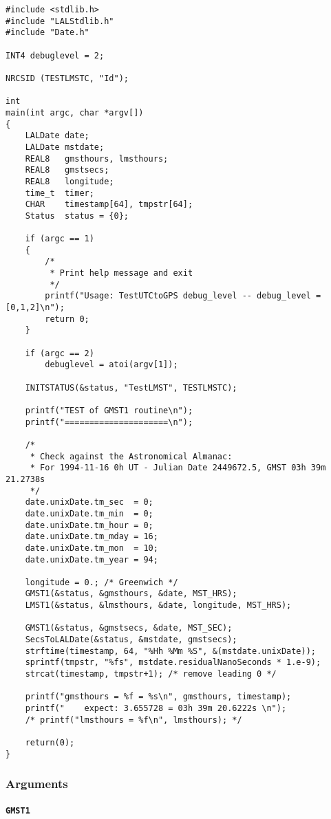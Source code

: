 \begin{verbatim}
#include <stdlib.h>
#include "LALStdlib.h"
#include "Date.h"

INT4 debuglevel = 2;

NRCSID (TESTLMSTC, "Id");

int
main(int argc, char *argv[])
{
    LALDate date;
    LALDate mstdate;
    REAL8   gmsthours, lmsthours;
    REAL8   gmstsecs;
    REAL8   longitude;
    time_t  timer;
    CHAR    timestamp[64], tmpstr[64];
    Status  status = {0};

    if (argc == 1)
    {
        /*
         * Print help message and exit
         */
        printf("Usage: TestUTCtoGPS debug_level -- debug_level = [0,1,2]\n");
        return 0;
    }

    if (argc == 2)
        debuglevel = atoi(argv[1]);

    INITSTATUS(&status, "TestLMST", TESTLMSTC);

    printf("TEST of GMST1 routine\n");
    printf("=====================\n");

    /*
     * Check against the Astronomical Almanac:
     * For 1994-11-16 0h UT - Julian Date 2449672.5, GMST 03h 39m 21.2738s
     */
    date.unixDate.tm_sec  = 0;
    date.unixDate.tm_min  = 0;
    date.unixDate.tm_hour = 0;
    date.unixDate.tm_mday = 16;
    date.unixDate.tm_mon  = 10;
    date.unixDate.tm_year = 94;

    longitude = 0.; /* Greenwich */
    GMST1(&status, &gmsthours, &date, MST_HRS);
    LMST1(&status, &lmsthours, &date, longitude, MST_HRS);

    GMST1(&status, &gmstsecs, &date, MST_SEC);
    SecsToLALDate(&status, &mstdate, gmstsecs);
    strftime(timestamp, 64, "%Hh %Mm %S", &(mstdate.unixDate));
    sprintf(tmpstr, "%fs", mstdate.residualNanoSeconds * 1.e-9);
    strcat(timestamp, tmpstr+1); /* remove leading 0 */
    
    printf("gmsthours = %f = %s\n", gmsthours, timestamp);
    printf("    expect: 3.655728 = 03h 39m 20.6222s \n");
    /* printf("lmsthours = %f\n", lmsthours); */

    return(0);
}
\end{verbatim}


\subsubsection{Arguments}

\paragraph{\texttt{GMST1}}

